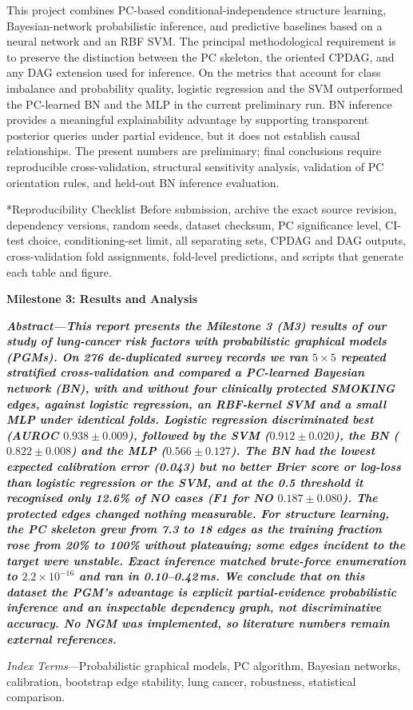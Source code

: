 \documentclass[10pt,twocolumn,letterpaper]{article}
\makeatletter
\renewcommand\section{\@startsection{section}{1}{\z@}{1.5ex plus 0.5ex minus 0.2ex}{1ex plus 0.2ex}{\centering\normalfont\footnotesize\scshape}}
\newcommand{\us}{\textunderscore\allowbreak}
\newcommand{\var}[1]{{\small\ttfamily\let\_\us #1}}
\newcommand{\startms}{\setcounter{section}{0}\setcounter{table}{0}\setcounter{figure}{0}\setcounter{equation}{0}}
\newcommand{\msheader}[3]{\par\vspace{6pt}\begin{center}{\large\bfseries #1}\end{center}\vspace{-2pt}
{\small\bfseries\itshape\noindent\textit{Abstract}---#2\par\vspace{2pt}\noindent\textit{Index Terms}---#3\par}\vspace{2pt}\startms}
\makeatother
\begin{document}
\section{Conclusion}
This project combines PC-based conditional-independence structure learning, Bayesian-network probabilistic inference, and predictive baselines based on a neural network and an RBF SVM. The principal methodological requirement is to preserve the distinction between the PC skeleton, the oriented CPDAG, and any DAG extension used for inference. On the metrics that account for class imbalance and probability quality, logistic regression and the SVM outperformed the PC-learned BN and the MLP in the current preliminary run. BN inference provides a meaningful explainability advantage by supporting transparent posterior queries under partial evidence, but it does not establish causal relationships. The present numbers are preliminary; final conclusions require reproducible cross-validation, structural sensitivity analysis, validation of PC orientation rules, and held-out BN inference evaluation.

\section*{Reproducibility Checklist}
\noindent Before submission, archive the exact source revision, dependency versions, random seeds, dataset checksum, PC significance level, CI-test choice, conditioning-set limit, all separating sets, CPDAG and DAG outputs, cross-validation fold assignments, fold-level predictions, and scripts that generate each table and figure.

\msheader{Milestone 3: Results and Analysis}%
{This report presents the Milestone 3 (M3) results of our study of lung-cancer risk factors with probabilistic graphical models (PGMs). On 276 de-duplicated survey records we ran $5\times5$ repeated stratified cross-validation and compared a PC-learned Bayesian network (BN), with and without four clinically protected \var{SMOKING} edges, against logistic regression, an RBF-kernel SVM and a small MLP under identical folds. Logistic regression discriminated best (AUROC $0.938\pm0.009$), followed by the SVM ($0.912\pm0.020$), the BN ($0.822\pm0.008$) and the MLP ($0.566\pm0.127$). The BN had the lowest expected calibration error (0.043) but no better Brier score or log-loss than logistic regression or the SVM, and at the 0.5 threshold it recognised only 12.6\% of NO cases (F1 for NO $0.187\pm0.080$). The protected edges changed nothing measurable. For structure learning, the PC skeleton grew from 7.3 to 18 edges as the training fraction rose from 20\% to 100\% without plateauing; some edges incident to the target were unstable. Exact inference matched brute-force enumeration to $2.2\times10^{-16}$ and ran in 0.10--0.42\,ms. We conclude that on this dataset the PGM's advantage is explicit partial-evidence probabilistic inference and an inspectable dependency graph, not discriminative accuracy. No NGM was implemented, so literature numbers remain external references.}%
{Probabilistic graphical models, PC algorithm, Bayesian networks, calibration, bootstrap edge stability, lung cancer, robustness, statistical comparison.}
\label{ms3}
\end{document}
